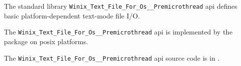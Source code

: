 
The standard library {\tt Winix\_Text\_File\_For\_Os\_\_Premicrothread} api defines basic platform-dependent text-mode file I/O.

The {\tt Winix\_Text\_File\_For\_Os\_\_Premicrothread} api is implemented by the  package on posix platforms.

The {\tt Winix\_Text\_File\_For\_Os\_\_Premicrothread} api source code is in .





